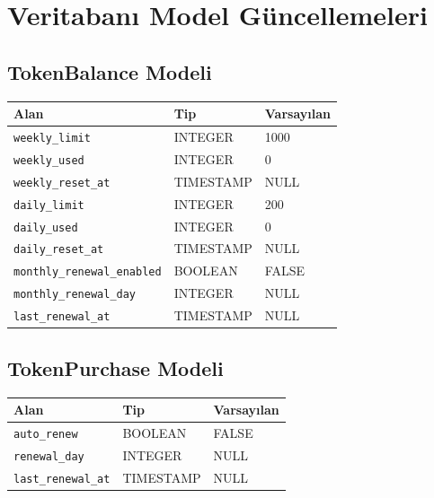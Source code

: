 \documentclass[12pt,a4paper]{article}
\begin{document}
\section{Veritaban{\i} Model G\"{u}ncellemeleri}

\subsection{TokenBalance Modeli}
\begin{center}
\begin{tabular}{|l|l|l|}
\hline
\textbf{Alan} & \textbf{Tip} & \textbf{Varsay{\i}lan} \\
\hline
\texttt{weekly\_limit}             & INTEGER   & 1000  \\
\texttt{weekly\_used}              & INTEGER   & 0     \\
\texttt{weekly\_reset\_at}         & TIMESTAMP & NULL  \\
\texttt{daily\_limit}              & INTEGER   & 200   \\
\texttt{daily\_used}               & INTEGER   & 0     \\
\texttt{daily\_reset\_at}          & TIMESTAMP & NULL  \\
\texttt{monthly\_renewal\_enabled} & BOOLEAN   & FALSE \\
\texttt{monthly\_renewal\_day}     & INTEGER   & NULL  \\
\texttt{last\_renewal\_at}         & TIMESTAMP & NULL  \\
\hline
\end{tabular}
\end{center}

\subsection{TokenPurchase Modeli}
\begin{center}
\begin{tabular}{|l|l|l|}
\hline
\textbf{Alan} & \textbf{Tip} & \textbf{Varsay{\i}lan} \\
\hline
\texttt{auto\_renew}       & BOOLEAN   & FALSE \\
\texttt{renewal\_day}      & INTEGER   & NULL  \\
\texttt{last\_renewal\_at} & TIMESTAMP & NULL  \\
\hline
\end{tabular}
\end{center}
\end{document}
